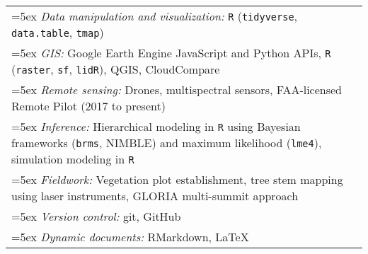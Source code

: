 \begin{longtable}{@{}>{\raggedright}p{5.25in} >{\raggedleft}X@{}}

\hangindent=5ex \emph{Data manipulation and visualization:} \texttt{R} (\texttt{tidyverse}, \texttt{data.table}, \texttt{tmap}) & \tabularnewline
\hangindent=5ex \emph{GIS:} Google Earth Engine JavaScript and Python APIs, \texttt{R} (\texttt{raster}, \texttt{sf}, \texttt{lidR}), QGIS, CloudCompare & \tabularnewline
\hangindent=5ex \emph{Remote sensing:} Drones, multispectral sensors, FAA-licensed Remote Pilot (2017 to present) & \tabularnewline
\hangindent=5ex \emph{Inference:} Hierarchical modeling in \texttt{R} using Bayesian frameworks (\texttt{brms}, NIMBLE) and maximum likelihood (\texttt{lme4}), simulation modeling in \texttt{R} & \tabularnewline
\hangindent=5ex \emph{Fieldwork:} Vegetation plot establishment, tree stem mapping using laser instruments, GLORIA multi-summit approach & \tabularnewline
\hangindent=5ex \emph{Version control:} git, GitHub & \tabularnewline
\hangindent=5ex \emph{Dynamic documents:} RMarkdown, \LaTeX{} & \tabularnewline

\end{longtable}